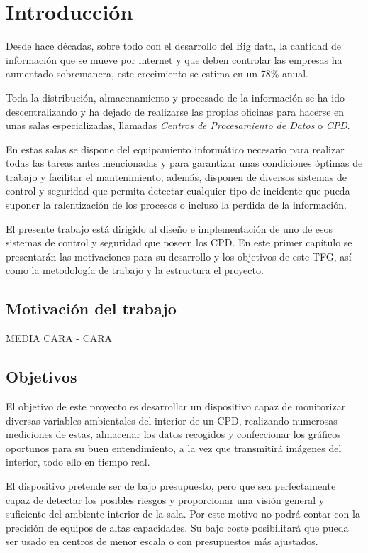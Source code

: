\chapter{Introducción} 
\label{ch:introduccion}
Desde hace décadas, sobre todo con el desarrollo del Big data, la cantidad de información que se mueve por internet y que deben controlar las empresas ha aumentado sobremanera, este crecimiento se estima en un 78\% anual\cite{monleon-getino_impacto_2015}.

Toda la distribución, almacenamiento y procesado de la información se ha ido descentralizando y ha dejado de realizarse las propias oficinas para hacerse en unas salas especializadas, llamadas \textit{Centros de Procesamiento de Datos} o \textit{CPD}. 

En estas salas se dispone del equipamiento informático necesario para realizar todas las tareas antes mencionadas y para garantizar unas condiciones óptimas de trabajo y facilitar el mantenimiento, además, disponen de diversos sistemas de control y seguridad que permita detectar cualquier tipo de incidente que pueda suponer la ralentización de los procesos o incluso la perdida de la información.

El presente trabajo está dirigido al diseño e implementación de uno de esos sistemas de control y seguridad que poseen los CPD. En este primer capítulo se presentarán las motivaciones para su desarrollo y los objetivos de este TFG, así como la metodología de trabajo y la estructura el proyecto.

\section{Motivación del trabajo}
MEDIA CARA - CARA

\section{Objetivos}
El objetivo de este proyecto es desarrollar un dispositivo capaz de monitorizar diversas variables ambientales del interior de un CPD, realizando numerosas mediciones de estas, almacenar los datos recogidos y confeccionar los gráficos oportunos para su buen entendimiento, a la vez que transmitirá imágenes del interior, todo ello en tiempo real.

El dispositivo pretende ser de bajo presupuesto, pero que sea perfectamente capaz de detectar los posibles riesgos y proporcionar una visión general y suficiente del ambiente interior de la sala. Por este motivo no podrá contar con la precisión de equipos de altas capacidades. Su bajo coste posibilitará que pueda ser usado en centros de menor escala o con presupuestos más ajustados.


